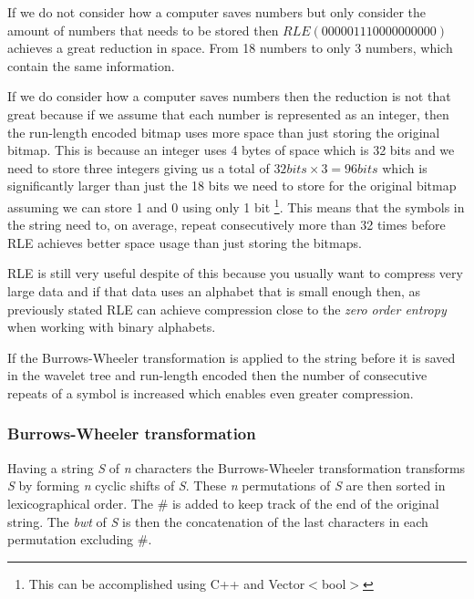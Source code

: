 If we do not consider how a computer saves numbers but only consider the amount of numbers that needs to be stored then $RLE(000001110000000000)$ achieves a great reduction in space.
From 18 numbers to only 3 numbers, which contain the same information.

If we do consider how a computer saves numbers then the reduction is not that great because if we assume that each number is represented as an integer, then the run-length encoded bitmap uses more space than just storing the original bitmap. 
This is because an integer uses 4 bytes of space which is 32 bits and we need to store three integers giving us a total of $32 bits \times 3 = 96 bits$ which is significantly larger than just the 18 bits we need to store for the original bitmap assuming we can store 1 and 0 using only 1 bit \footnote{This can be accomplished using C++ and Vector$<$bool$>$}. 
This means that the symbols in the string need to, on average, repeat consecutively more than 32 times before RLE achieves better space usage than just storing the bitmaps.

RLE is still very useful despite of this because you usually want to compress very large data and if that data uses an alphabet that is small enough then, as previously stated RLE can achieve compression close to the \textit{zero order entropy} when working with binary alphabets.

If the Burrows-Wheeler transformation is applied to the string before it is saved in the wavelet tree and run-length encoded then the number of consecutive repeats of a symbol is increased which enables even greater compression.

\subsubsection{Burrows-Wheeler transformation}
Having a string \textit{S} of \textit{n} characters the Burrows-Wheeler transformation \citep{BWToriginalArticle} transforms \textit{S} by forming \textit{n} cyclic shifts of \textit{S}. 
These \textit{n} permutations of \textit{S} are then sorted in lexicographical order.
The \# is added to keep track of the end of the original string.
The \textit{bwt} of \textit{S} is then the concatenation of the last characters in each permutation excluding $\#$.

